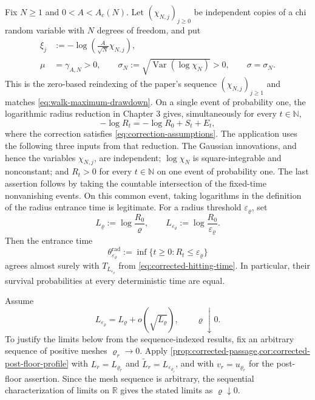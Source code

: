 \documentclass[10pt,reqno,a4paper]{amsart}
\numberwithin{equation}{section}
\theoremstyle{plain}
\theoremstyle{definition}
\theoremstyle{remark}
\newcommand{\R}{\mathbb{R}}
\newcommand{\N}{\mathbb{N}}
\newcommand{\1}{\mathbf{1}}
\DeclareMathOperator{\Var}{Var}
\begin{document}
Fix $N\geq1$ and $0<A<A_c(N)$.  Let $(\chi_{N,j})_{j\geq0}$ be independent
copies of a chi random variable with $N$ degrees of freedom, and put
\begin{equation}\label{eq:gaussian-increments}
  \begin{aligned}
    \xi_j
    &:=-\log\left(\frac{A}{\sqrt N}\chi_{N,j}\right),\\
    \mu&=\gamma_{A,N}>0,\qquad
    \sigma_N:=\sqrt{\Var(\log\chi_N)}>0,\qquad
    \sigma=\sigma_N.
  \end{aligned}
\end{equation}
This is the zero-based reindexing of the paper's sequence
$(\chi_{N,j})_{j\geq1}$ and matches \cref{eq:walk-maximum-drawdown}.
On a single event of probability one, the logarithmic radius reduction in
Chapter 3 gives, simultaneously for every $t\in\N$,
\begin{equation}\label{eq:log-radius-reduction}
  -\log R_t
  =
  -\log R_0+S_t+E_t,
\end{equation}
where the correction satisfies \cref{eq:correction-assumptions}.
The application uses the following three inputs from that reduction.  The
Gaussian innovations, and hence the variables $\chi_{N,j}$, are independent;
$\log\chi_N$ is square-integrable and nonconstant; and $R_t>0$ for every
$t\in\N$ on one event of probability one.  The last assertion follows by
taking the countable intersection of the fixed-time nonvanishing events.  On
this common event, taking logarithms in the definition of the radius entrance
time is legitimate.
For a radius threshold $\varepsilon_\varrho$, set
\begin{equation}\label{eq:paper-levels}
  L_\varrho:=\log\frac{R_0}{\varrho},
  \qquad
  L_{\varepsilon_\varrho}:=
  \log\frac{R_0}{\varepsilon_\varrho}.
\end{equation}
Then the entrance time
\begin{equation*}
  \theta_{\varepsilon_\varrho}^{\mathrm{rad}}
  :=\inf\{t\geq0:R_t\leq\varepsilon_\varrho\}
\end{equation*}
agrees almost surely with $T_{L_{\varepsilon_\varrho}}$ from
\cref{eq:corrected-hitting-time}.  In particular, their survival
probabilities at every deterministic time are equal.

Assume
\begin{equation}\label{eq:paper-moving-level}
  L_{\varepsilon_\varrho}
  =L_\varrho+o(\sqrt{L_\varrho}),
  \qquad \varrho\downarrow0.
\end{equation}
To justify the limits below from the sequence-indexed results, fix an
arbitrary sequence of positive meshes $\varrho_r\to0$.  Apply
\cref{prop:corrected-passage,cor:corrected-post-floor-profile} with
$L_r=L_{\varrho_r}$ and
$\widetilde L_r=L_{\varepsilon_{\varrho_r}}$, and with
$v_r=u_{\varrho_r}$ for the post-floor assertion.  Since the mesh sequence is
arbitrary, the sequential characterization of limits on $\R$ gives the
stated limits as $\varrho\downarrow0$.
\end{document}
